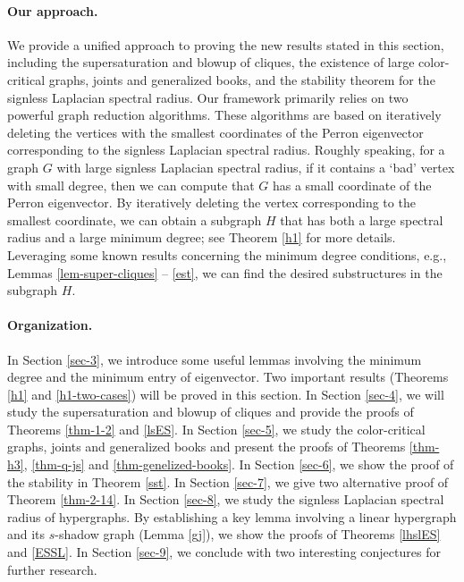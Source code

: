 \documentclass[11pt,a4paper]{article}
\theoremstyle{plain}
\theoremstyle{definition}
\begin{document}
\paragraph{Our approach.}
 We provide a unified approach to proving the 
 new results stated in this section, including the
 supersaturation and blowup of cliques, the existence of large color-critical graphs, joints and generalized books, and the stability theorem for the signless Laplacian spectral radius.  Our framework primarily relies on two powerful  graph reduction algorithms.  These algorithms are based on iteratively deleting the vertices with the smallest coordinates of the Perron eigenvector corresponding to the signless Laplacian spectral radius. Roughly speaking, for a graph $G$ with large signless Laplacian spectral radius, if it contains a `bad' vertex with small degree, then we can compute that $G$ has a small coordinate of the Perron eigenvector. By iteratively deleting the vertex corresponding to the smallest coordinate, 
 we can obtain a subgraph $H$ that has both a large spectral radius and a large minimum degree; see Theorem \ref{h1} for more details.  
 Leveraging some known results concerning the minimum degree conditions, e.g., Lemmas \ref{lem-super-cliques} -- \ref{est}, we can find the desired substructures in the subgraph $H$.



\paragraph{Organization.} 
In Section \ref{sec-3}, we introduce some useful lemmas involving the minimum degree and the minimum entry of eigenvector. 
Two important results (Theorems \ref{h1} and \ref{h1-two-cases}) will be proved in this section. In Section \ref{sec-4}, we will study the supersaturation and blowup of cliques and provide the proofs of Theorems \ref{thm-1-2} and \ref{lsES}. 
In Section \ref{sec-5}, we study the color-critical graphs, joints and generalized books and present the proofs of Theorems \ref{thm-h3}, \ref{thm-q-js} and \ref{thm-genelized-books}. In Section \ref{sec-6}, we show the proof of the stability in Theorem \ref{sst}. In Section \ref{sec-7}, we give two alternative proof of Theorem \ref{thm-2-14}. 
In Section \ref{sec-8}, we study the signless Laplacian spectral radius of hypergraphs. 
{By establishing a key lemma involving a linear hypergraph and its $s$-shadow graph (Lemma \ref{gj})}, we show the proofs of Theorems \ref{lhslES} and \ref{ESSL}. In Section \ref{sec-9}, we conclude with two interesting conjectures for further research. 
\end{document}
